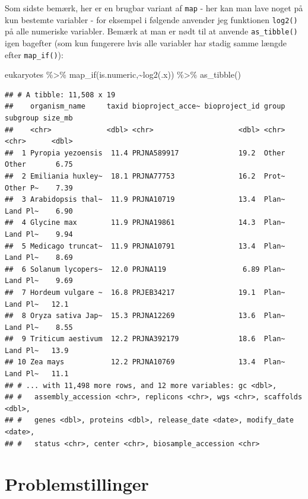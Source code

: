 \documentclass[
]{book}
\newenvironment{Shaded}{\begin{snugshade}}{\end{snugshade}}
\newcommand{\FunctionTok}[1]{\textcolor[rgb]{0.00,0.00,0.00}{#1}}
\newcommand{\NormalTok}[1]{#1}
\newcommand{\SpecialCharTok}[1]{\textcolor[rgb]{0.00,0.00,0.00}{#1}}
\begin{document}
Som sidste bemærk, her er en brugbar variant af \texttt{map} - her kan man lave noget på kun bestemte variabler - for eksempel i følgende anvender jeg funktionen \texttt{log2()} på alle numeriske variabler. Bemærk at man er nødt til at anvende \texttt{as\_tibble()} igen bagefter (som kun fungerere hvis alle variabler har stadig samme længde efter \texttt{map\_if()}):

\begin{Shaded}
\begin{Highlighting}[]
\NormalTok{eukaryotes }\SpecialCharTok{\%\textgreater{}\%} \FunctionTok{map\_if}\NormalTok{(is.numeric,}\SpecialCharTok{\textasciitilde{}}\FunctionTok{log2}\NormalTok{(.x)) }\SpecialCharTok{\%\textgreater{}\%} \FunctionTok{as\_tibble}\NormalTok{()}
\end{Highlighting}
\end{Shaded}

\begin{verbatim}
## # A tibble: 11,508 x 19
##    organism_name     taxid bioproject_acce~ bioproject_id group subgroup size_mb
##    <chr>             <dbl> <chr>                    <dbl> <chr> <chr>      <dbl>
##  1 Pyropia yezoensis  11.4 PRJNA589917              19.2  Other Other       6.75
##  2 Emiliania huxley~  18.1 PRJNA77753               16.2  Prot~ Other P~    7.39
##  3 Arabidopsis thal~  11.9 PRJNA10719               13.4  Plan~ Land Pl~    6.90
##  4 Glycine max        11.9 PRJNA19861               14.3  Plan~ Land Pl~    9.94
##  5 Medicago truncat~  11.9 PRJNA10791               13.4  Plan~ Land Pl~    8.69
##  6 Solanum lycopers~  12.0 PRJNA119                  6.89 Plan~ Land Pl~    9.69
##  7 Hordeum vulgare ~  16.8 PRJEB34217               19.1  Plan~ Land Pl~   12.1 
##  8 Oryza sativa Jap~  15.3 PRJNA12269               13.6  Plan~ Land Pl~    8.55
##  9 Triticum aestivum  12.2 PRJNA392179              18.6  Plan~ Land Pl~   13.9 
## 10 Zea mays           12.2 PRJNA10769               13.4  Plan~ Land Pl~   11.1 
## # ... with 11,498 more rows, and 12 more variables: gc <dbl>,
## #   assembly_accession <chr>, replicons <chr>, wgs <chr>, scaffolds <dbl>,
## #   genes <dbl>, proteins <dbl>, release_date <date>, modify_date <date>,
## #   status <chr>, center <chr>, biosample_accession <chr>
\end{verbatim}

\hypertarget{problemstillinger-6}{%
\section{Problemstillinger}\label{problemstillinger-6}}
\end{document}
